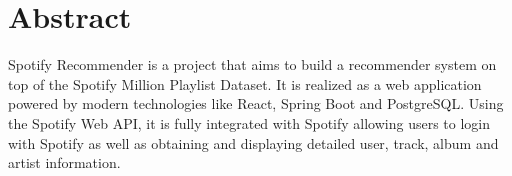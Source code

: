 \chapter*{Abstract}

Spotify Recommender is a project that aims to build a recommender system on top of the Spotify Million Playlist Dataset. It is realized as a web application powered by modern technologies like React, Spring Boot and PostgreSQL. Using the Spotify Web API, it is fully integrated with Spotify allowing users to login with Spotify as well as obtaining and displaying detailed user, track, album and artist information.
